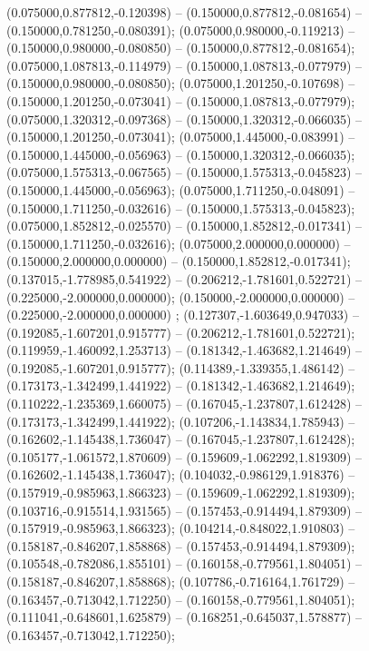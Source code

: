  (0.075000,0.877812,-0.120398) -- (0.150000,0.877812,-0.081654) -- (0.150000,0.781250,-0.080391);
 (0.075000,0.980000,-0.119213) -- (0.150000,0.980000,-0.080850) -- (0.150000,0.877812,-0.081654);
 (0.075000,1.087813,-0.114979) -- (0.150000,1.087813,-0.077979) -- (0.150000,0.980000,-0.080850);
 (0.075000,1.201250,-0.107698) -- (0.150000,1.201250,-0.073041) -- (0.150000,1.087813,-0.077979);
 (0.075000,1.320312,-0.097368) -- (0.150000,1.320312,-0.066035) -- (0.150000,1.201250,-0.073041);
 (0.075000,1.445000,-0.083991) -- (0.150000,1.445000,-0.056963) -- (0.150000,1.320312,-0.066035);
 (0.075000,1.575313,-0.067565) -- (0.150000,1.575313,-0.045823) -- (0.150000,1.445000,-0.056963);
 (0.075000,1.711250,-0.048091) -- (0.150000,1.711250,-0.032616) -- (0.150000,1.575313,-0.045823);
 (0.075000,1.852812,-0.025570) -- (0.150000,1.852812,-0.017341) -- (0.150000,1.711250,-0.032616);
 (0.075000,2.000000,0.000000) -- (0.150000,2.000000,0.000000) -- (0.150000,1.852812,-0.017341);
 (0.137015,-1.778985,0.541922) -- (0.206212,-1.781601,0.522721) -- (0.225000,-2.000000,0.000000);
 (0.150000,-2.000000,0.000000) -- (0.225000,-2.000000,0.000000) ;
 (0.127307,-1.603649,0.947033) -- (0.192085,-1.607201,0.915777) -- (0.206212,-1.781601,0.522721);
 (0.119959,-1.460092,1.253713) -- (0.181342,-1.463682,1.214649) -- (0.192085,-1.607201,0.915777);
 (0.114389,-1.339355,1.486142) -- (0.173173,-1.342499,1.441922) -- (0.181342,-1.463682,1.214649);
 (0.110222,-1.235369,1.660075) -- (0.167045,-1.237807,1.612428) -- (0.173173,-1.342499,1.441922);
 (0.107206,-1.143834,1.785943) -- (0.162602,-1.145438,1.736047) -- (0.167045,-1.237807,1.612428);
 (0.105177,-1.061572,1.870609) -- (0.159609,-1.062292,1.819309) -- (0.162602,-1.145438,1.736047);
 (0.104032,-0.986129,1.918376) -- (0.157919,-0.985963,1.866323) -- (0.159609,-1.062292,1.819309);
 (0.103716,-0.915514,1.931565) -- (0.157453,-0.914494,1.879309) -- (0.157919,-0.985963,1.866323);
 (0.104214,-0.848022,1.910803) -- (0.158187,-0.846207,1.858868) -- (0.157453,-0.914494,1.879309);
 (0.105548,-0.782086,1.855101) -- (0.160158,-0.779561,1.804051) -- (0.158187,-0.846207,1.858868);
 (0.107786,-0.716164,1.761729) -- (0.163457,-0.713042,1.712250) -- (0.160158,-0.779561,1.804051);
 (0.111041,-0.648601,1.625879) -- (0.168251,-0.645037,1.578877) -- (0.163457,-0.713042,1.712250);
